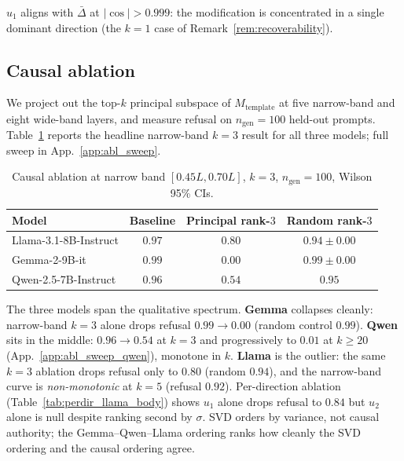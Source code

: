 \documentclass[10pt]{article}
\theoremstyle{definition}
\theoremstyle{remark}
\begin{document}
$u_1$ aligns with $\bar{\Delta}$ at $|\cos|>0.999$:
the modification is concentrated in a single dominant
direction (the $k=1$ case of
Remark~\ref{rem:recoverability}).

\subsection{Causal ablation}
\label{sec:diagnosis_ablation}

We project out the top-$k$ principal subspace of
$M_{\mathrm{template}}$ at five narrow-band and
eight wide-band layers, and measure refusal on
$n_{\mathrm{gen}}=100$ held-out prompts.
Table~\ref{tab:diagnosis_abl} reports the headline
narrow-band $k=3$ result for all three models; full
sweep in App.~\ref{app:abl_sweep}.

\begin{table}[h]
\centering
\caption{Causal ablation at narrow band $[0.45L, 0.70L]$,
$k=3$, $n_{\mathrm{gen}}=100$, Wilson 95\% CIs.}
\label{tab:diagnosis_abl}
\begin{tabular}{@{}lccc@{}}
\toprule
Model & Baseline & Principal rank-$3$
  & Random rank-$3$ \\
\midrule
Llama-3.1-8B-Instruct
  & $0.97$ & $0.80$ \;[$0.71, 0.87$] & $0.94 \pm 0.00$ \\
Gemma-2-9B-it
  & $0.99$ & $\mathbf{0.00}$ \;[$0.00, 0.04$] & $0.99 \pm 0.00$ \\
Qwen-2.5-7B-Instruct
  & $0.96$ & $0.54$ \;[$0.44, 0.63$] & $0.95$ \;[$0.89, 0.98$] \\
\bottomrule
\end{tabular}
\end{table}

The three models span the qualitative spectrum.
\textbf{Gemma} collapses cleanly: narrow-band $k=3$
alone drops refusal $0.99 \to \mathbf{0.00}$ (random
control $0.99$).  \textbf{Qwen} sits in the middle:
$0.96 \to 0.54$ at $k=3$ and progressively to
$0.01$ at $k\geq 20$ (App.~\ref{app:abl_sweep_qwen}),
monotone in $k$.  \textbf{Llama} is the outlier: the
same $k=3$ ablation drops refusal only to $0.80$
(random $0.94$), and the narrow-band curve is
\emph{non-monotonic} at $k=5$ (refusal $0.92$).
Per-direction ablation
(Table~\ref{tab:perdir_llama_body}) shows $u_1$ alone
drops refusal to $0.84$ but $u_2$ alone is null
despite ranking second by $\sigma$.  SVD orders by
variance, not causal authority; the Gemma--Qwen--Llama
ordering ranks how cleanly the SVD ordering and the
causal ordering agree.
\end{document}
